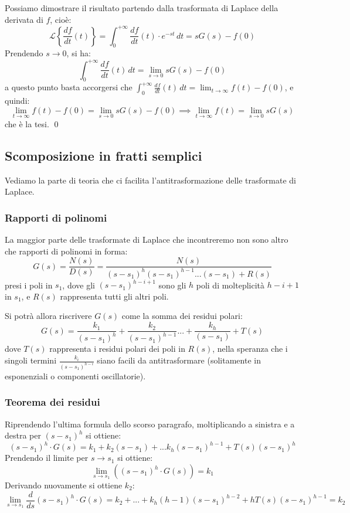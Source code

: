 \documentclass[a4paper,11pt]{article}
\begin{document}
Possiamo dimostrare il risultato partendo dalla trasformata di Laplace della derivata di $f$, cioè:
$$
\mathcal{L}\left\{ \frac{df}{dt}(t) \right\} = \int_0^{+\infty} \frac{df}{dt}(t) \cdot e^{-st} \, dt = sG(s) - f(0)
$$
Prendendo $s \rightarrow 0$, si ha:
$$
\int_0^{+\infty} \frac{df}{dt}(t) \, dt = \lim_{s \rightarrow 0} sG(s) - f(0)
$$
a questo punto basta accorgersi che $\int_0^{+\infty} \frac{df}{dt}(t) \, dt = \lim_{t \rightarrow \infty} f(t) - f(0)$, e quindi:
$$
\lim_{t \rightarrow \infty} f(t) - f(0) = \lim_{s \rightarrow 0} sG(s) - f(0) 
\implies 
\lim_{t \rightarrow \infty} f(t) = \lim_{s \rightarrow 0} sG(s) 
$$
che è la tesi. \qed

\subsection{Scomposizione in fratti semplici}
Vediamo la parte di teoria che ci facilita l'antitrasformazione delle trasformate di Laplace.

\subsubsection{Rapporti di polinomi}
La maggior parte delle trasformate di Laplace che incontreremo non sono altro che rapporti di polinomi in forma:
$$
G(s) = \frac{N(s)}{D(s)} = \frac{N(s)}{(s - s_1)^h (s - s_1)^{h - 1} ... (s - s_1) + R(s)}
$$
presi i poli in $s_1$, dove gli $(s - s_1)^{h - i + 1}$ sono gli $h$ poli di molteplicità $h - i + 1$ in $s_1$, e $R(s)$ rappresenta tutti gli altri poli.

Si potrà allora riscrivere $G(s)$ come la somma dei residui polari:
$$
G(s) = \frac{k_1}{(s - s_1)^h} + \frac{k_2}{(s - s_1)^{h - 1}} ... + \frac{k_h}{(s - s_1)} + T(s)
$$
dove $T(s)$ rappresenta i residui polari dei poli in $R(s)$, nella speranza che i singoli termini $\frac{k_i}{(s - s_1)^{h - i}}$ siano facili da antitrasformare (solitamente in esponenziali o componenti oscillatorie).

\subsubsection{Teorema dei residui}
Riprendendo l'ultima formula dello scorso paragrafo, moltiplicando a sinistra e a destra per $(s - s_1)^h$ si ottiene:
$$
(s - s_1)^h \cdot G(s) = k_1 + k_2 (s - s_1) + ... k_h (s - s_1)^{h - 1} + T(s) (s - s_1)^h 
$$
Prendendo il limite per $s \rightarrow s_1$ si ottiene:
$$
\lim_{s \rightarrow s_1} \left( (s - s_1)^h \cdot G(s) \right) = k_1
$$
Derivando nuovamente si ottiene $k_2$:
$$
\lim_{s \rightarrow s_1} \frac{d}{ds} (s - s_1)^h \cdot G(s) = k_2 + ... + k_h (h - 1) (s - s_1)^{h - 2} + h T(s) (s - s_1)^{h - 1} = k_2
$$
\end{document}
